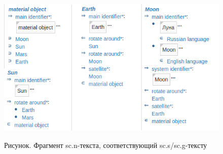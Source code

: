 \begin{figure}
	\centering
	\caption{Рисунок. Фрагмент sc.n-текста, соответствующий sc.s/sc.g-тексту}
	\includegraphics[scale=0.4]{images/intro/scs/example_transf_scn.png}
	\label{scs_example_scn}
\end{figure}


